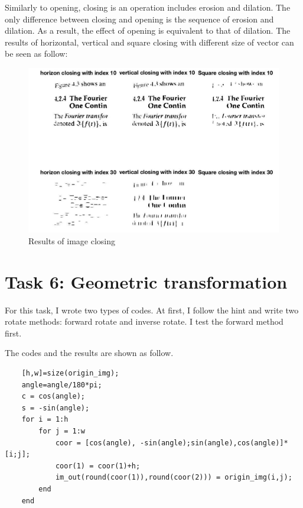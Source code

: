 \documentclass{article}
\begin{document}
Similarly to opening, closing is an operation includes erosion and dilation. The only difference between closing and opening is the sequence of erosion and dilation. As a result, the effect of opening is equivalent to that of dilation. The results of horizontal, vertical and square closing with different size of vector can be seen as follow:

\begin{figure}[htbp]
    \centering
    \includegraphics[scale = 0.28]{fig20.jpg}
    \caption{Results of image closing}
    \label{fig20}
\end{figure}

\section{Task 6: Geometric transformation}

For this task, I wrote two types of codes. At first, I follow the hint and write two rotate methods: forward rotate and inverse rotate. I test the forward method first. 

The codes and the results are shown as follow.

\begin{lstlisting}
    [h,w]=size(origin_img);  
    angle=angle/180*pi;
    c = cos(angle);  
    s = -sin(angle);  
    for i = 1:h
        for j = 1:w
            coor = [cos(angle), -sin(angle);sin(angle),cos(angle)]*[i;j];
            coor(1) = coor(1)+h;
            im_out(round(coor(1)),round(coor(2))) = origin_img(i,j);
        end
    end
\end{lstlisting}
\end{document}
